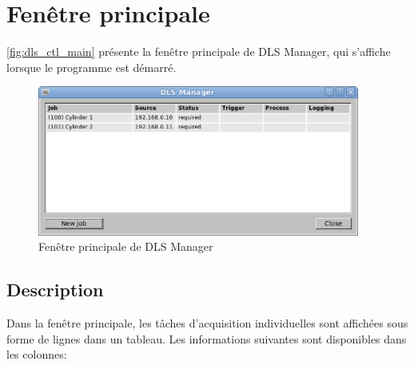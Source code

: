 \documentclass[a4paper,12pt,BCOR6mm,bibtotoc,idxtotoc]{scrbook}
\begin{document}
\section{Fen\^etre principale}

\autoref{fig:dls_ctl_main} pr\'esente la fen\^etre principale de
DLS Manager, qui s'affiche lorsque le programme est d\'emarr\'e.


\begin{figure}[tbh]
  \begin{center}
    \includegraphics[width=300pt]{bilder/ctl_main_en}
  \end{center}
  \caption{Fen\^etre principale de DLS Manager}
  \label{fig:dls_ctl_main}
\end{figure}


\subsection{Description}

Dans la fen\^etre principale, les t\^aches d'acquisition
individuelles sont affich\'ees sous forme de lignes dans un tableau.
Les informations suivantes sont disponibles dans les colonnes:
\end{document}
